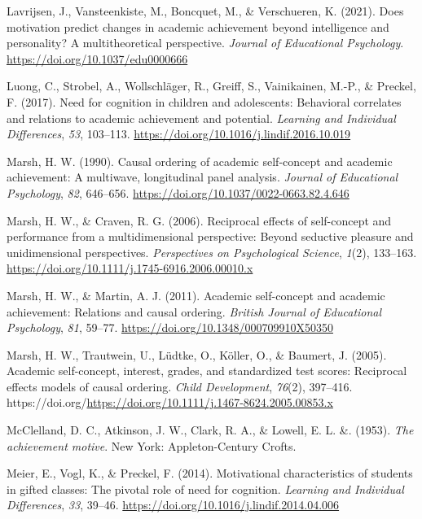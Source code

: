 \documentclass[
  man]{apa6}
\newlength{\cslhangindent}
\newlength{\cslentryspacingunit} %
\newenvironment{CSLReferences}[2] %
 {%
  \setlength{\parindent}{0pt}
  \ifodd #1
  \let\oldpar\par
  \def\par{\hangindent=\cslhangindent\oldpar}
  \fi
  \setlength{\parskip}{#2\cslentryspacingunit}
 }%
 {}
\begin{document}
\begin{CSLReferences}{1}{0}
\leavevmode{}%
Lavrijsen, J., Vansteenkiste, M., Boncquet, M., \& Verschueren, K. (2021). Does motivation predict changes in academic achievement beyond intelligence and personality? A multitheoretical perspective. \emph{Journal of Educational Psychology}. \url{https://doi.org/10.1037/edu0000666}

\leavevmode{}%
Luong, C., Strobel, A., Wollschläger, R., Greiff, S., Vainikainen, M.-P., \& Preckel, F. (2017). Need for cognition in children and adolescents: Behavioral correlates and relations to academic achievement and potential. \emph{Learning and Individual Differences}, \emph{53}, 103--113. \url{https://doi.org/10.1016/j.lindif.2016.10.019}

\leavevmode{}%
Marsh, H. W. (1990). Causal ordering of academic self-concept and academic achievement: A multiwave, longitudinal panel analysis. \emph{Journal of Educational Psychology}, \emph{82}, 646--656. \url{https://doi.org/10.1037/0022-0663.82.4.646}

\leavevmode{}%
Marsh, H. W., \& Craven, R. G. (2006). Reciprocal effects of self-concept and performance from a multidimensional perspective: Beyond seductive pleasure and unidimensional perspectives. \emph{Perspectives on Psychological Science}, \emph{1}(2), 133--163. \url{https://doi.org/10.1111/j.1745-6916.2006.00010.x}

\leavevmode{}%
Marsh, H. W., \& Martin, A. J. (2011). Academic self-concept and academic achievement: Relations and causal ordering. \emph{British Journal of Educational Psychology}, \emph{81}, 59--77. \url{https://doi.org/10.1348/000709910X50350}

\leavevmode{}%
Marsh, H. W., Trautwein, U., Lüdtke, O., Köller, O., \& Baumert, J. (2005). Academic self-concept, interest, grades, and standardized test scores: Reciprocal effects models of causal ordering. \emph{Child Development}, \emph{76}(2), 397--416. https://doi.org/\url{https://doi.org/10.1111/j.1467-8624.2005.00853.x}

\leavevmode{}%
McClelland, D. C., Atkinson, J. W., Clark, R. A., \& Lowell, E. L. \&. (1953). \emph{The achievement motive}. New York: Appleton-Century Crofts.

\leavevmode{}%
Meier, E., Vogl, K., \& Preckel, F. (2014). Motivational characteristics of students in gifted classes: The pivotal role of need for cognition. \emph{Learning and Individual Differences}, \emph{33}, 39--46. \url{https://doi.org/10.1016/j.lindif.2014.04.006}


\end{CSLReferences}
\end{document}
